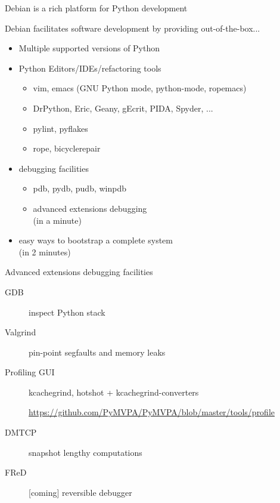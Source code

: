 \documentclass[]{beamer}
\begin{document}
\begin{frame}{Debian is a rich platform for Python development}
  \begin{block}{}
    Debian facilitates software development by providing \alert{out-of-the-box}...
  \end{block}
  \begin{itemize}
  \item Multiple supported versions of Python
  \item Python Editors/IDEs/refactoring tools
    \begin{itemize}
    \item vim, emacs (GNU Python mode, python-mode, ropemacs)
    \item DrPython, Eric, Geany, gEcrit, PIDA, Spyder, ...
    \item pylint, pyflakes
    \item rope, bicyclerepair
    \end{itemize}
  \item debugging facilities
    \begin{itemize}
    \item pdb, pydb, pudb, winpdb
    \item advanced extensions debugging\\
      (in a minute)
    \end{itemize}
  \item easy ways to bootstrap a complete system\\
    (in 2 minutes)
  \end{itemize}
\end{frame}

\def\Maroon{}%
\def\Green{}%

\begin{frame}{Advanced extensions debugging facilities}
  \begin{description}
  \item[GDB] inspect Python stack
  \item[Valgrind] pin-point segfaults and memory leaks
  \item[Profiling GUI]kcachegrind, hotshot + kcachegrind-converters\\
    \begin{tiny}
      \url{https://github.com/PyMVPA/PyMVPA/blob/master/tools/profile}
    \end{tiny}
  \item[DMTCP] snapshot lengthy computations
  \item[FReD] [coming] reversible debugger
  \end{description}
\end{frame}
\end{document}
